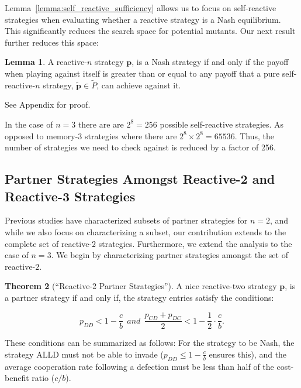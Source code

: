 \documentclass{article}
\theoremstyle{definition}
\newtheorem{theorem}{Theorem}[section]
\newtheorem{lemma}[theorem]{Lemma}
\begin{document}
Lemma~\ref{lemma:self_reactive_sufficiency} allows us to focus on self-reactive
strategies when evaluating whether a reactive strategy is a Nash equilibrium.
This significantly reduces the search space for potential mutants. Our next
result further reduces this space:

\begin{lemma}\label{lemma:nash_against_pure_self_reactive}
  A reactive-$n$ strategy $\mathbf{p}$, is a Nash strategy if and only if the
  payoff when playing against itself is greater than or equal to any payoff that
  a pure self-reactive-$n$ strategy, $\tilde{\mathbf{p}} \in \tilde{P}$, can
  achieve against it.
\end{lemma}

See Appendix for proof.

In the case of $n=3$ there are are $2^8 = 256$ possible self-reactive strategies.
As opposed to memory-3 strategies where there are $2^8 \times 2^8 = 65536$. Thus,
the number of strategies we need to check against is reduced by a factor of 256.

\subsection{Partner Strategies Amongst Reactive-2 and Reactive-3 Strategies}

Previous studies have characterized subsets of partner strategies for $n = 2$,
and while we also focus on characterizing a subset, our contribution extends to
the complete set of reactive-$2$ strategies. Furthermore, we extend the analysis
to the case of $n = 3$. We begin by characterizing partner strategies amongst
the set of reactive-$2$.

\begin{theorem}[``Reactive-2 Partner Strategies'']\label{theorem:reactive_two_partner_strategies}
A nice reactive-two strategy $\mathbf{p}$, is a partner strategy if and only if,
the strategy entries satisfy the conditions:

\begin{equation}\label{eq:two_bit_conditions}
  \displaystyle p_{DD} < 1\!-\! \frac{c}{b}  ~~and~~ \displaystyle \frac{p_{CD} + p_{DC}}{2} < 1- \frac{1}{2} \cdot \frac{c}{b}.
\end{equation}
\end{theorem}

These conditions can be summarized as follows: For the strategy to be Nash, the
strategy ALLD must not be able to invade ($p_{DD} \leq 1 - \frac{c}{b}$
ensures this), and the average cooperation rate following a defection must be
less than half of the cost-benefit ratio ($c/b$).
\end{document}
